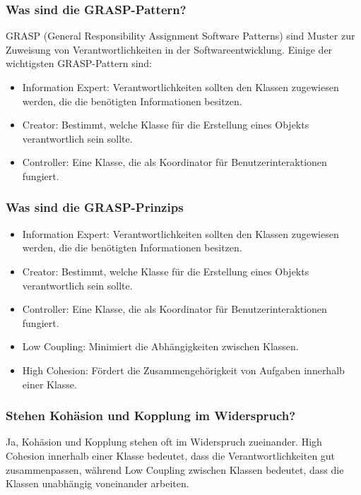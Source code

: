 \documentclass[main.tex]{subfiles}
\begin{document}
\subsubsection*{Was sind die \gls{GRASP-Pattern}?}
GRASP (General Responsibility Assignment Software Patterns) sind Muster zur Zuweisung von Verantwortlichkeiten in der Softwareentwicklung. Einige der wichtigsten \gls{GRASP-Pattern} sind:
\begin{itemize}
    \item \gls{Information Expert}: Verantwortlichkeiten sollten den Klassen zugewiesen werden, die die benötigten Informationen besitzen.
    \item Creator: Bestimmt, welche Klasse für die Erstellung eines Objekts verantwortlich sein sollte.
    \item Controller: Eine Klasse, die als Koordinator für Benutzerinteraktionen fungiert.
\end{itemize}

\subsubsection*{Was sind die \glspl{GRASP-Prinzip}}
\begin{itemize}
     \item \gls{Information Expert}: Verantwortlichkeiten sollten den Klassen zugewiesen werden, die die benötigten Informationen besitzen.
    \item Creator: Bestimmt, welche Klasse für die Erstellung eines Objekts verantwortlich sein sollte.
    \item Controller: Eine Klasse, die als Koordinator für Benutzerinteraktionen fungiert.
    \item  \gls{Low Coupling}: Minimiert die Abhängigkeiten zwischen Klassen.
    \item \gls{High Cohesion}: Fördert die Zusammengehörigkeit von Aufgaben innerhalb einer Klasse.
\end{itemize}


\subsubsection*{Stehen \gls{Kohäsion} und \gls{Kopplung} im Widerspruch?}
Ja, \gls{Kohäsion} und \gls{Kopplung} stehen oft im Widerspruch zueinander. \gls{High Cohesion} innerhalb einer Klasse bedeutet, dass die Verantwortlichkeiten gut zusammenpassen, während \gls{Low Coupling} zwischen Klassen bedeutet, dass die Klassen unabhängig voneinander arbeiten.
\end{document}
